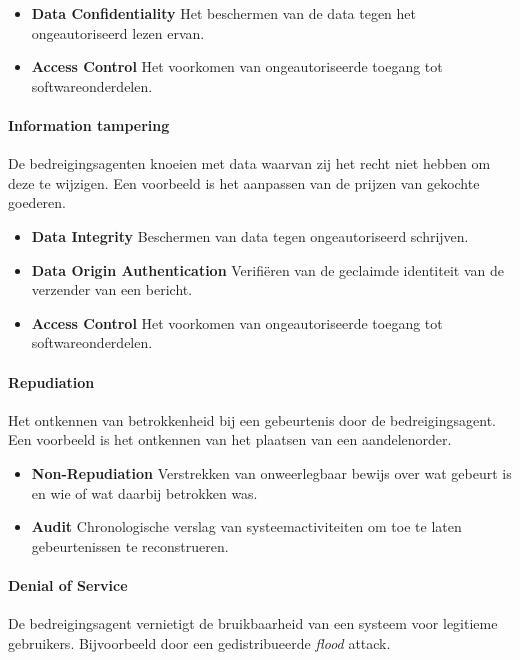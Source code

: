 \documentclass[../main.tex]{subfiles}
\begin{document}
\begin{itemize}
	\item \textbf{Data Confidentiality} Het beschermen van de data tegen het ongeautoriseerd lezen ervan.
	\item \textbf{Access Control} Het voorkomen van ongeautoriseerde toegang tot softwareonderdelen.
\end{itemize}

\paragraph{Information tampering}
De bedreigingsagenten knoeien met data waarvan zij het recht niet hebben om deze te wijzigen. Een voorbeeld is het aanpassen van de prijzen van gekochte goederen.

\begin{itemize}
	\item \textbf{Data Integrity} Beschermen van data tegen ongeautoriseerd schrijven.
	\item \textbf{Data Origin Authentication} Verifi\"eren van de geclaimde identiteit van de verzender van een bericht.
	\item \textbf{Access Control} Het voorkomen van ongeautoriseerde toegang tot softwareonderdelen.
\end{itemize}

\paragraph{Repudiation} Het ontkennen van betrokkenheid bij een gebeurtenis door de bedreigingsagent. Een voorbeeld is het ontkennen van het plaatsen van een aandelenorder.

\begin{itemize}
	\item \textbf{Non-Repudiation} Verstrekken van onweerlegbaar bewijs over wat gebeurt is en wie of wat daarbij betrokken was.
	\item \textbf{Audit} Chronologische verslag van systeemactiviteiten om toe te laten gebeurtenissen te reconstrueren.
\end{itemize}

\paragraph{Denial of Service}
De bedreigingsagent vernietigt de bruikbaarheid van een systeem voor legitieme gebruikers. Bijvoorbeeld door een gedistribueerde \textit{flood} attack.
\end{document}
